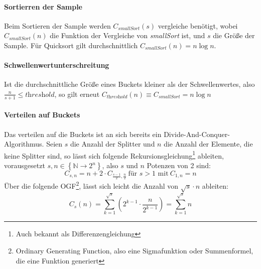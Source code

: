 		\paragraph{Sortierren der Sample}
			Beim Sortieren der Sample werden $C_\textit{smallSort}(s)$ vergleiche benötigt, wobei $C_\textit{smallSort}(n)$ die Funktion der Vergleiche von \textit{smallSort} ist, und $s$ die Größe der Sample.
			Für Quicksort gilt durchschnittlich $C_\textit{smallSort}(n)=n\log{n}$. \autocite{wikipedia-contributors-2022}
			
		\paragraph{Schwellenwertunterschreitung}
			Ist die durchschnittliche Größe eines Buckets kleiner als der Schwellenwertes, also $\frac{n}{s+1}\leq \textit{threshold}$, so gilt erneut $C_\textit{threshold}(n)\equiv C_\textit{smallSort}=n\log{n}$
		
		\paragraph{Verteilen auf Buckets}
			Das verteilen auf die Buckets ist an sich bereits ein Divide-And-Conquer-Algorithmus.
			Seien $s$ die Anzahl der Splitter und $n$ die Anzahl der Elemente, die keine Splitter sind, so lässt sich folgende Rekursionsgleichung\footnote{Auch bekannt als Differenzengleichung} ableiten, vorausgesetzt $s,n\in \left\{ \mathbb{N}\to 2^n \right\}$, also $s$ und $n$ Potenzen von 2 sind:
			\begin{equation}
				C_{s,n}=n+2\cdot C_{\frac{s-1}{2}, \frac{n}{2}}\ \text{für $s>1$ mit}\ C_{1,n}=n
			\end{equation}
			Über die folgende OGF\footnote{Ordinary Generating Function, also eine Sigmafunktion oder Summenformel, die eine Funktion generiert}, lässt sich leicht die Anzahl von $\sqrt{s}\cdot n$ ableiten:
			\begin{equation}
				C_s(n)=\sum_{k=1}^{\sqrt{s}}\left(2^{k-1}\cdot \frac{n}{2^{k-1}}\right)=\sum_{k=1}^{\sqrt{s}}n
			\end{equation}
